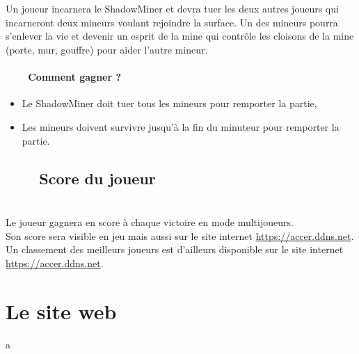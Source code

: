 \documentclass[titlepage, 13px, a4paper]{report}
\begin{document}
\paragraph{} \hspace{0pt} \\
Un joueur incarnera le ShadowMiner et devra tuer les deux autres joueurs qui 
incarneront deux mineurs voulant rejoindre la surface. Un des mineurs pourra 
s’enlever la vie et devenir un esprit de la mine qui contrôle les cloisons de 
la mine (porte, mur, gouffre) pour aider l’autre mineur. \\

\paragraph{~~~~Comment gagner ?} \hspace{0pt}
{\begin{itemize}
	\item Le ShadowMiner doit tuer tous les mineurs pour remporter la partie,
	\item Les mineurs doivent survivre jusqu’à la fin du minuteur pour remporter la partie. \\
\end{itemize}}

\subsection[Score du joueur]{~~~~Score du joueur}
\paragraph{} \hspace{0pt} \\
Le joueur gagnera en score à chaque victoire en mode multijoueurs. \\
Son score sera visible en jeu mais aussi sur le site internet \url{https://accer.ddns.net}. \\
Un classement des meilleurs joueurs est d’ailleurs disponible sur le site internet \url{https://accer.ddns.net}. \\


\newpage

\section{Le site web}
\paragraph{} \hspace{0pt}
a
\end{document}
